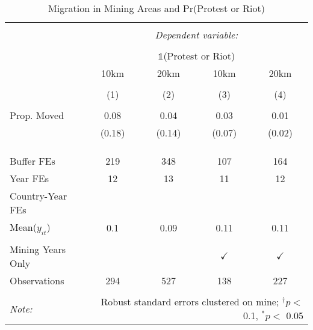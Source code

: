 
\begin{table}[ht!] \centering 
  \caption{Migration in Mining Areas and Pr(Protest or Riot)} 
  \label{tab:did_dhs_migration_protest} 
\begin{tabular}{@{\extracolsep{0pt}}lcccc} 
\\[-1.8ex]\hline 
\hline \\[-1.8ex] 
 & \multicolumn{4}{c}{\textit{Dependent variable:}} \\ 
\cline{2-5} 
\\[-1.8ex] & \multicolumn{4}{c}{$\mathbb{1}$(Protest or Riot)} \\ 
 & 10km & 20km & 10km & 20km \\ 
\\[-1.8ex] & (1) & (2) & (3) & (4)\\ 
\hline \\[-1.8ex] 
 Prop. Moved & 0.08 & 0.04 & 0.03 & 0.01 \\ 
  & (0.18) & (0.14) & (0.07) & (0.02) \\ 
  & & & & \\ 
\hline \\[-1.8ex] 
\hline \\[-1.8ex] Buffer FEs & 219 & 348 & 107 & 164 \\ 
Year FEs & 12 & 13 & 11 & 12 \\ 
Country-Year FEs &  &  &  &  \\ 
Mean($y_{it}$) & 0.1 & 0.09 & 0.11 & 0.11 \\ 
\hline \\[-1.8ex] Mining Years Only &  &  & $\checkmark$ & $\checkmark$ \\ 
Observations & 294 & 527 & 138 & 227 \\ 
\hline 
\hline \\[-1.8ex] 
\textit{Note:}  & \multicolumn{4}{r}{Robust standard errors clustered on mine; $^{\dagger} p <$ 0.1, $^*p <$ 0.05} \\ 
\end{tabular} 
\end{table} 
